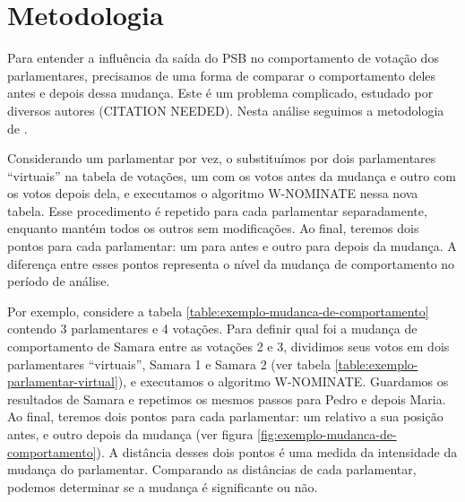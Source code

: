 \documentclass[a4paper,titlepage]{ppgi}\usepackage[]{graphicx}\usepackage[]{color}
\begin{document}
\section{Metodologia}{\label{sec:analise-saida-psb:metodologia}

Para entender a influência da saída do PSB no comportamento de votação dos
parlamentares, precisamos de uma forma de comparar o comportamento deles antes
e depois dessa mudança. Este é um problema complicado, estudado por diversos
autores (CITATION NEEDED). Nesta análise seguimos a metodologia de
\cite{Poole2005}.

Considerando um parlamentar por vez, o substituímos por dois parlamentares
``virtuais'' na tabela de votações, um com os votos antes da mudança e outro
com os votos depois dela, e executamos o algoritmo W-NOMINATE nessa nova
tabela. Esse procedimento é repetido para cada parlamentar separadamente,
enquanto mantém todos os outros sem modificações. Ao final, teremos dois pontos
para cada parlamentar: um para antes e outro para depois da mudança. A
diferença entre esses pontos representa o nível da mudança de comportamento no
período de análise. 

Por exemplo, considere a tabela \ref{table:exemplo-mudanca-de-comportamento}
contendo 3 parlamentares e 4 votações. Para definir qual foi a mudança de
comportamento de Samara entre as votações 2 e 3, dividimos seus votos em dois
parlamentares ``virtuais'', Samara 1 e Samara 2 (ver tabela
\ref{table:exemplo-parlamentar-virtual}), e executamos o algoritmo W-NOMINATE.
Guardamos os resultados de Samara e repetimos os mesmos passos para Pedro e
depois Maria. Ao final, teremos dois pontos para cada parlamentar: um relativo
a sua posição antes, e outro depois da mudança (ver figura
\ref{fig:exemplo-mudanca-de-comportamento}). A distância desses dois pontos é
uma medida da intensidade da mudança do parlamentar.  Comparando as distâncias
de cada parlamentar, podemos determinar se a mudança é significante ou não.


}
\end{document}
